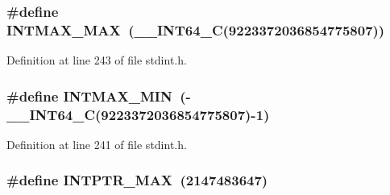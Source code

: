 \subsubsection[{\texorpdfstring{I\+N\+T\+M\+A\+X\+\_\+\+M\+AX}{INTMAX_MAX}}]{\setlength{\rightskip}{0pt plus 5cm}\#define I\+N\+T\+M\+A\+X\+\_\+\+M\+AX~({\bf \+\_\+\+\_\+\+I\+N\+T64\+\_\+C}(9223372036854775807))}\hypertarget{win_2_l_a_d_s_p_a__plugins-win_2glibc__includes_2stdint_8h_a022b9b0a3564d786244a4631847c37a3}{}\label{win_2_l_a_d_s_p_a__plugins-win_2glibc__includes_2stdint_8h_a022b9b0a3564d786244a4631847c37a3}


Definition at line 243 of file stdint.\+h.

\subsubsection[{\texorpdfstring{I\+N\+T\+M\+A\+X\+\_\+\+M\+IN}{INTMAX_MIN}}]{\setlength{\rightskip}{0pt plus 5cm}\#define I\+N\+T\+M\+A\+X\+\_\+\+M\+IN~(-\/{\bf \+\_\+\+\_\+\+I\+N\+T64\+\_\+C}(9223372036854775807)-\/1)}\hypertarget{win_2_l_a_d_s_p_a__plugins-win_2glibc__includes_2stdint_8h_a2b0a3edfc672154f606dc3ad26277b61}{}\label{win_2_l_a_d_s_p_a__plugins-win_2glibc__includes_2stdint_8h_a2b0a3edfc672154f606dc3ad26277b61}


Definition at line 241 of file stdint.\+h.

\subsubsection[{\texorpdfstring{I\+N\+T\+P\+T\+R\+\_\+\+M\+AX}{INTPTR_MAX}}]{\setlength{\rightskip}{0pt plus 5cm}\#define I\+N\+T\+P\+T\+R\+\_\+\+M\+AX~(2147483647)}\hypertarget{win_2_l_a_d_s_p_a__plugins-win_2glibc__includes_2stdint_8h_a9e5742f2bae4a5283431a3c03499e3a9}{}\label{win_2_l_a_d_s_p_a__plugins-win_2glibc__includes_2stdint_8h_a9e5742f2bae4a5283431a3c03499e3a9}


